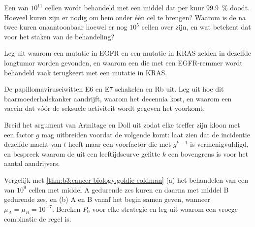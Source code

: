 \begin{exercise}[$\star\star$]\label{exo:b3:cancer-biology:7}
Een  van $10^{11}$ cellen wordt behandeld met een middel dat per
kuur \qty{99.9}{\%} doodt. Hoeveel kuren zijn er nodig om hem onder één
cel te brengen? Waarom is de  na twee kuren onaantoonbaar hoewel
er nog $10^{5}$ cellen over zijn, en wat betekent dat voor het staken
van de behandeling?
\end{exercise}

\begin{exercise}[$\star\star$]\label{exo:b3:cancer-biology:8}
Leg uit waarom een mutatie in EGFR en een mutatie in KRAS zelden in
dezelfde longtumor worden gevonden, en waarom een  die met een
EGFR-remmer wordt behandeld vaak terugkeert met een mutatie in KRAS.
\end{exercise}

\begin{exercise}[$\star\star$]\label{exo:b3:cancer-biology:9}
De papillomaviruseiwitten E6 en E7 schakelen  en Rb uit. Leg uit hoe
dit baarmoederhalskanker aandrijft, waarom het decennia kost, en waarom
een vaccin dat vóór de seksuele activiteit wordt gegeven het voorkomt.
\end{exercise}

\begin{exercise}[$\star\star\star$]\label{exo:b3:cancer-biology:10}
Breid het argument van Armitage en Doll uit zodat elke treffer zijn
kloon met een factor $g$ mag uitbreiden voordat de volgende komt: laat
zien dat de incidentie dezelfde macht van $t$ heeft maar een voorfactor
die met $g^{k-1}$ is vermenigvuldigd, en bespreek waarom de uit een
leeftijdscurve gefitte $k$ een bovengrens is voor het aantal
aandrijvers.
\end{exercise}

\begin{exercise}[$\star\star\star$]\label{exo:b3:cancer-biology:11}
Vergelijk met \cref{thm:b3:cancer-biology:goldie-coldman} (a) het
behandelen van een  van $10^{9}$ cellen met middel A gedurende zes
kuren en daarna met middel B gedurende zes, en (b) A en B vanaf het
begin samen geven, wanneer $\mu_{A} =
\mu_{B} = 10^{-7}$. Bereken $P_{0}$ voor elke strategie en leg uit
waarom een vroege combinatie de regel is.
\end{exercise}

